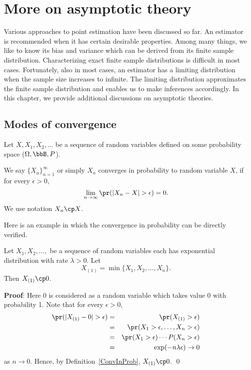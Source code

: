 \chapter{More on asymptotic theory}

Various approaches to point estimation have been discussed so far.
An estimator is recommended when it has certain desirable properties.
Among many things, we like to know its bias and variance
which can be derived from its finite sample distribution. 
Characterizing exact finite sample distributions is difficult
in most cases. Fortunately, also in most cases, an estimator has
a limiting distribution when the sample size increases to infinite. 
The limiting distribution approximates the finite sample distribution
and enables us to make inferences accordingly. 
In this chapter, we provide additional discussions
on asymptotic theories.

\section{Modes of convergence}

Let $X, X_1, X_2, \ldots$ be a sequence of random variables defined on
some probability space ($\Omega, \bbB, P$).

\begin{defi}
\label{ConvInProb}
We say $\{X_n\}_{n=1}^\infty$ or simply $X_n$ converges in probability
to random variable $X$, if for every $\epsilon > 0$,
\[ 
\lim_{n \to \infty}
\pr ( |X_n - X| > \epsilon ) = 0.
\]
We use notation $X_n \cp X$.
\end{defi}

Here is an example in which the convergence in probability 
can be directly verified.

\begin{example}
Let $X_1, X_2, \ldots, $ be a sequence of \iid
random variables each has exponential distribution
with rate $\lambda > 0$. 
Let
\[ 
X_{(1)} = \min \{ X_1, X_2, \ldots, X_n\}.
\]
Then $X_{(1)} \cp 0$.
\end{example}

\noindent
{\bf Proof}:
Here $0$ is considered as a random variable which takes value 0 with
probability 1. Note that for every $\epsilon > 0$,
\begin{eqnarray*}
\pr ( |X_{(1)} - 0| > \epsilon) 
&=& 
\pr(X_{(1)} > \epsilon) \\
&=& 
\pr(X_1 > \epsilon, \ldots, X_n > \epsilon)\\
&=& 
\pr(X_1 > \epsilon) \cdots P(X_n > \epsilon)\\
&=&
\exp ( - n \lambda \epsilon) \to 0
\end{eqnarray*}
as $n \to 0$.
Hence, by Definition~\ref{ConvInProb}, $X_{(1)} \cp 0$. \qed


